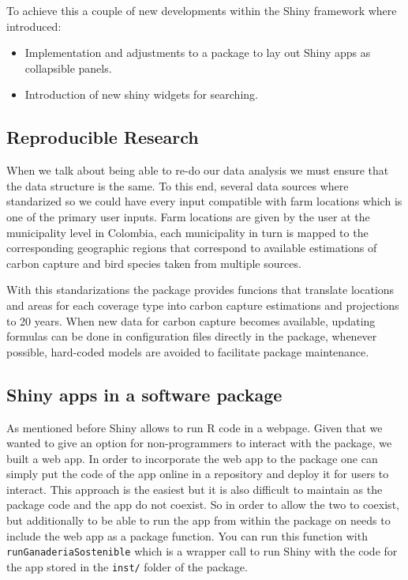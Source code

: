 \documentclass[
]{jss}
\providecommand{\tightlist}{%
  \setlength{\itemsep}{0pt}\setlength{\parskip}{0pt}}
\begin{document}
To achieve this a couple of new developments within the Shiny framework
where introduced:

\begin{itemize}
\tightlist
\item
  Implementation and adjustments to a package to lay out Shiny apps as
  collapsible panels.
\item
  Introduction of new shiny widgets for searching.
\end{itemize}

\hypertarget{reproducible-research}{%
\subsection{Reproducible Research}\label{reproducible-research}}

When we talk about being able to re-do our data analysis we must ensure
that the data structure is the same. To this end, several data sources
where standarized so we could have every input compatible with farm
locations which is one of the primary user inputs. Farm locations are
given by the user at the municipality level in Colombia, each
municipality in turn is mapped to the corresponding geographic regions
that correspond to available estimations of carbon capture and bird
species taken from multiple sources.

With this standarizations the package provides funcions that translate
locations and areas for each coverage type into carbon capture
estimations and projections to 20 years. When new data for carbon
capture becomes available, updating formulas can be done in
configuration files directly in the package, whenever possible,
hard-coded models are avoided to facilitate package maintenance.

\hypertarget{shiny-apps-in-a-software-package}{%
\subsection{Shiny apps in a software
package}\label{shiny-apps-in-a-software-package}}

As mentioned before Shiny allows to run R code in a webpage. Given that
we wanted to give an option for non-programmers to interact with the
package, we built a web app. In order to incorporate the web app to the
package one can simply put the code of the app online in a repository
and deploy it for users to interact. This approach is the easiest but it
is also difficult to maintain as the package code and the app do not
coexist. So in order to allow the two to coexist, but additionally to be
able to run the app from within the package on needs to include the web
app as a package function. You can run this function with
\texttt{runGanaderiaSostenible} which is a wrapper call to run Shiny
with the code for the app stored in the \texttt{inst/} folder of the
package.
\end{document}
